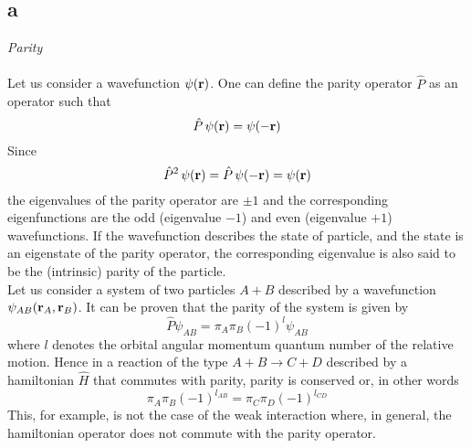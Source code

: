 \subsection*{a} 

\vspace{10pt}
\emph{Parity} \\
\vspace{10pt} \\
Let us consider a wavefunction $\psi(\mathbf{r})$. One can define the parity operator $\hat P$ as an operator such that 
\begin{equation*}
    \hat P \, \psi(\mathbf{r}) = \psi(-\mathbf{r})
\end{equation*}
Since
\begin{equation}
    \hat P^2 \, \psi(\mathbf{r}) = \hat P \, \psi(-\mathbf{r}) = \psi(\mathbf{r})
    \label{eq:eigenvalue_equation_parity}
\end{equation}
the eigenvalues of the parity operator are $\pm 1$ and the corresponding eigenfunctions are the odd (eigenvalue $-1$) and even (eigenvalue $+1$) wavefunctions. If the wavefunction
describes the state of particle, and the state is an eigenstate of the parity operator, the corresponding eigenvalue is also said to be the (intrinsic) parity of the particle. \\
Let us consider a system of two particles $A+B$ described by a wavefunction $\psi_{AB}(\mathbf{r}_A, \mathbf{r}_B)$. It can be proven that the parity of the system is given by 
\begin{equation*}
    \hat P \psi_{AB} = \pi_A \pi_B (-1)^l \psi_{AB}
\end{equation*}
where $l$ denotes the orbital angular momentum quantum number of the relative motion. Hence in a reaction of the type $A+B \rightarrow C+D$ described by a hamiltonian $\hat H$ that commutes with parity,
parity is conserved or, in other words
\begin{equation*}
    \pi_A \pi_B (-1)^{l_{AB}} = \pi_C \pi_D (-1)^{l_{CD}} 
\end{equation*}
This, for example, is not the case of the weak interaction where, in general, the hamiltonian operator does not commute with the parity operator. \\
\vspace{10pt} \\


